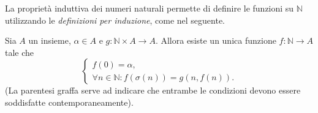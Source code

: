 \documentclass[italian,a4paper,hidelinks,headinclude]{scrartcl}
\newcommand{\NN}{{\mathbb N}}
\begin{document}
La proprietà induttiva dei numeri naturali permette di definire le funzioni su
$\NN$ utilizzando le \emph{definizioni per induzione}, come nel seguente.
%
\begin{theorem}\label{th:def_induction}
Sia $A$ un insieme, $\alpha \in A$ e $g\colon \NN\times A \to A$.
Allora esiste un unica funzione $f\colon \NN \to A$ tale che
\begin{equation}\label{eq:485452}
\begin{cases}
  f(0) = \alpha,\\
  \forall n\in \NN\colon f(\sigma(n)) = g(n, f(n)).
\end{cases}
\end{equation}
(La parentesi graffa serve ad indicare che entrambe le condizioni devono
essere soddisfatte contemporaneamente).
\end{theorem}
%
\end{document}
